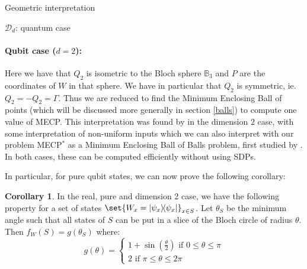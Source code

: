 \documentclass{article}
\theoremstyle{definition}
\newtheorem{cor}[theo]{Corollary}
\theoremstyle{remark}
\begin{document}
\begin{subsection}{Geometric interpretation}
\begin{subsubsection}{$\mathcal{D}_d$: quantum case}
    \paragraph{Qubit case ($d = 2$):}
    \label{geoQubit}
    Here we have that $Q_2$ is isometric to the Bloch sphere $\mathbb{B}_3$ and $P$ are the coordinates of $W$ in that sphere. We have in particular that $Q_2$ is symmetric, ie. $Q_2=-Q_2 = \Gamma$. Thus we are reduced to find the Minimum Enclosing Ball of points (which will be discussed more generally in section \ref{balls}) to compute one value of MECP.
    This interpretation was found by \cite{DT10} in the dimension $2$ case, with some interpretation of non-uniform inputs which we can also interpret with our problem MECP$^*$ as a Minimum Enclosing Ball of Balls problem, first studied by \cite{Megiddo89}. In both cases, these can be computed efficiently without using SDPs.

    In particular, for pure qubit states, we can now prove the following corollary:
    \begin{cor}
      In the real, pure and dimension 2 case, we have the following property for a set of states $\set{W_x = \dyad{\psi_x}}_{x \in S}$. Let $\theta_S$ be the minimum angle such that all states of $S$ can be put in a slice of the Bloch circle of radius $\theta$. Then $f_W(S) = g(\theta_S)$ where:
      \[
      g(\theta)=\begin{cases}
      1 + \sin(\frac{\theta}{2}) \text{ if } 0 \leq \theta \leq \pi\\
      2 \text{ if } \pi \leq \theta \leq 2\pi
      \end{cases}
      \]
      \label{corPureReal}
      \end{cor}


\end{subsubsection}
\end{subsection}
\end{document}
